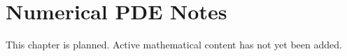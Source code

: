 
\section*{Numerical PDE Notes}
This chapter is planned. Active mathematical content has not yet been added.
